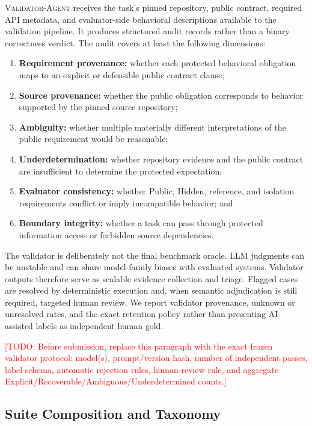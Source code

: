 \documentclass[acmsmall,screen,review,anonymous]{acmart}
\newcommand{\validatoragent}{\textsc{Validator-Agent}\xspace}
\newcommand{\draftnote}[1]{\textcolor{red}{[TODO: #1]}}
\begin{document}
\validatoragent receives the task's pinned repository, public contract, required
API metadata, and evaluator-side behavioral descriptions available to the
validation pipeline. It produces structured audit records rather than a binary
correctness verdict. The audit covers at least the following dimensions:
\begin{enumerate}
  \item \textbf{Requirement provenance:} whether each protected behavioral
        obligation maps to an explicit or defensible public contract clause;
  \item \textbf{Source provenance:} whether the public obligation corresponds to
        behavior supported by the pinned source repository;
  \item \textbf{Ambiguity:} whether multiple materially different interpretations
        of the public requirement would be reasonable;
  \item \textbf{Underdetermination:} whether repository evidence and the public
        contract are insufficient to determine the protected expectation;
  \item \textbf{Evaluator consistency:} whether Public, Hidden, reference, and
        isolation requirements conflict or imply incompatible behavior; and
  \item \textbf{Boundary integrity:} whether a task can pass through protected
        information access or forbidden source dependencies.
\end{enumerate}

The validator is deliberately not the final benchmark oracle. LLM judgments can
be unstable and can share model-family biases with evaluated systems. Validator
outputs therefore serve as scalable evidence collection and triage. Flagged cases
are resolved by deterministic execution and, when semantic adjudication is still
required, targeted human review. We report validator provenance, unknown or
unresolved rates, and the exact retention policy rather than presenting AI-assisted
labels as independent human gold.

\draftnote{Before submission, replace this paragraph with the exact frozen
validator protocol: model(s), prompt/version hash, number of independent passes,
label schema, automatic rejection rules, human-review rule, and aggregate
Explicit/Recoverable/Ambiguous/Underdetermined counts.}

\subsection{Suite Composition and Taxonomy}
\label{sec:suite}
\end{document}
